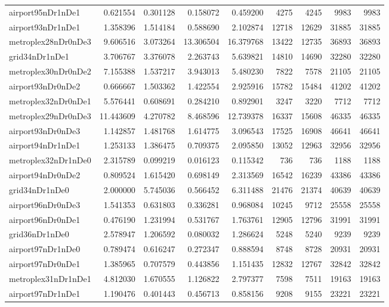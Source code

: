 \begin{longtable}{|l|r|r|r|r|r|r|r|r|}
airport95nDr1nDe1 & 0.621554 & 0.301128 & 0.158072 & 0.459200 & 4275 & 4245 & 9983 & 9983 \\
airport93nDr1nDe1 & 1.358396 & 1.514184 & 0.588690 & 2.102874 & 12718 & 12629 & 31885 & 31885 \\
metroplex28nDr0nDe3 & 9.606516 & 3.073264 & 13.306504 & 16.379768 & 13422 & 12735 & 36893 & 36893 \\
grid34nDr1nDe1 & 3.706767 & 3.376078 & 2.263743 & 5.639821 & 14810 & 14690 & 32280 & 32280 \\
metroplex30nDr0nDe2 & 7.155388 & 1.537217 & 3.943013 & 5.480230 & 7822 & 7578 & 21105 & 21105 \\
airport93nDr0nDe2 & 0.666667 & 1.503362 & 1.422554 & 2.925916 & 15782 & 15484 & 41202 & 41202 \\
metroplex32nDr0nDe1 & 5.576441 & 0.608691 & 0.284210 & 0.892901 & 3247 & 3220 & 7712 & 7712 \\
metroplex29nDr0nDe3 & 11.443609 & 4.270782 & 8.468596 & 12.739378 & 16337 & 15608 & 46335 & 46335 \\
airport93nDr0nDe3 & 1.142857 & 1.481768 & 1.614775 & 3.096543 & 17525 & 16908 & 46641 & 46641 \\
airport94nDr1nDe1 & 1.253133 & 1.386475 & 0.709375 & 2.095850 & 13052 & 12963 & 32956 & 32956 \\
metroplex32nDr1nDe0 & 2.315789 & 0.099219 & 0.016123 & 0.115342 & 736 & 736 & 1188 & 1188 \\
airport94nDr0nDe2 & 0.809524 & 1.615420 & 0.698149 & 2.313569 & 16542 & 16239 & 43386 & 43386 \\
grid34nDr1nDe0 & 2.000000 & 5.745036 & 0.566452 & 6.311488 & 21476 & 21374 & 40639 & 40639 \\
airport96nDr0nDe3 & 1.541353 & 0.631803 & 0.336281 & 0.968084 & 10245 & 9712 & 25558 & 25558 \\
airport96nDr0nDe1 & 0.476190 & 1.231994 & 0.531767 & 1.763761 & 12905 & 12796 & 31991 & 31991 \\
grid36nDr1nDe0 & 2.578947 & 1.206592 & 0.080032 & 1.286624 & 5248 & 5240 & 9239 & 9239 \\
airport97nDr1nDe0 & 0.789474 & 0.616247 & 0.272347 & 0.888594 & 8748 & 8728 & 20931 & 20931 \\
airport97nDr0nDe1 & 1.385965 & 0.707579 & 0.443856 & 1.151435 & 12832 & 12767 & 32842 & 32842 \\
metroplex31nDr1nDe1 & 4.812030 & 1.670555 & 1.126822 & 2.797377 & 7598 & 7511 & 19163 & 19163 \\
airport97nDr1nDe1 & 1.190476 & 0.401443 & 0.456713 & 0.858156 & 9208 & 9155 & 23221 & 23221 \\

\end{longtable}
